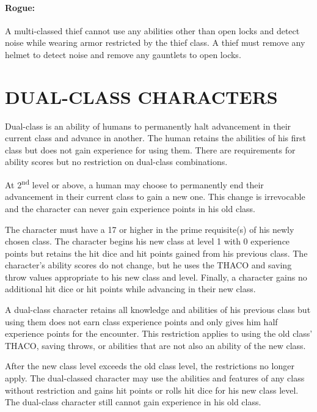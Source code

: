 \begin{multicols}{2}
\paragraph{Rogue:} A multi-classed thief cannot use any abilities other than open locks and detect noise while wearing armor restricted by the thief class.  A thief must remove any helmet to detect noise and remove any gauntlets to open locks.

 
\section{DUAL-CLASS CHARACTERS}

Dual-class is an ability of humans to permanently halt advancement in their current class and advance in another.  The human retains the abilities of his first class but does not gain experience for using them.  There are requirements for ability scores but no restriction on dual-class combinations.

At 2\textsuperscript{nd} level or above, a human may choose to permanently end their advancement in their current class to gain a new one.  This change is irrevocable and the character can never gain experience points in his old class.

The character must have a 17 or higher in the prime requisite(s) of his newly chosen class.  The character begins his new class at level 1 with 0 experience points but retains the hit dice and hit points gained from his previous class.  The character's ability scores do not change, but he uses the THACO and saving throw values appropriate to his new class and level.  Finally, a character gains no additional hit dice or hit points while advancing in their new class.

A dual-class character retains all knowledge and abilities of his previous class but using them does not earn class experience points and only gives him half experience points for the encounter.  This restriction applies to using the old class' THACO, saving throws, or abilities that are not also an ability of the new class.

After the new class level exceeds the old class level, the restrictions no longer apply.  The dual-classed character may use the abilities and features of any class without restriction and gains hit points or rolls hit dice for his new class level.  The dual-class character still cannot gain experience in his old class.  


\end{multicols}
